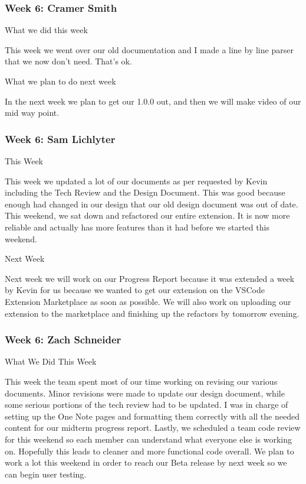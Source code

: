  \subsubsection{Week 6: Cramer Smith}

What we did this week



This week we went over our old documentation and I made a line by line parser that we now don't need. That's ok.



What we plan to do next week



In the next week we plan to get our 1.0.0 out, and then we will make video of our mid way point.  \\ 

 \subsubsection{Week 6: Sam Lichlyter}

This Week

This week we updated a lot of our documents as per requested by Kevin including the Tech Review and the Design Document. This was good because enough had changed in our design that our old design document was out of date. This weekend, we sat down and refactored our entire extension. It is now more reliable and actually has more features than it had before we started this weekend. 



Next Week

Next week we will work on our Progress Report because it was extended a week by Kevin for us because we wanted to get our extension on the VSCode Extension Marketplace as soon as possible. We will also work on uploading our extension to the marketplace and finishing up the refactors by tomorrow evening. \\ 

 \subsubsection{Week 6: Zach Schneider}

What We Did This Week

This week the team spent most of our time working on revising our various documents. Minor revisions were made to update our design document, while some serious portions of the tech review had to be updated. I was in charge of setting up the One Note pages and formatting them correctly with all the needed content for our midterm progress report. Lastly, we scheduled a team code review for this weekend so each member can understand what everyone else is working on. Hopefully this leads to cleaner and more functional code overall. We plan to work a lot this weekend in order to reach our Beta release by next week so we can begin user testing.



